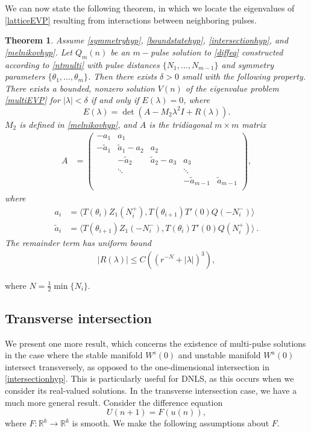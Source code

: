 \documentclass[12pt]{elsarticle}
\def\R{{\mathbb R}}
\newtheorem{theorem}{Theorem}
\begin{document}
We can now state the following theorem, in which we locate the eigenvalues of \cref{latticeEVP} resulting from interactions between neighboring pulses.

\begin{theorem}\label{stabilitytheorem}
Assume \cref{symmetryhyp}, \cref{boundstatehyp}, \cref{intersectionhyp}, and \cref{melnikovhyp}. Let $Q_m(n)$ be an $m-$pulse solution to \cref{diffeq} constructed according to \cref{ntmulti} with pulse distances $\{ N_1, \dots, N_{m-1}\}$ and symmetry parameters $\{\theta_1, \dots, \theta_m\}$. Then there exists $\delta > 0$ small with the following property. There exists a bounded, nonzero solution $V(n)$ of the eigenvalue problem \cref{multiEVP} for $|\lambda| < \delta$ if and only if $E(\lambda) = 0$, where
\begin{equation}\label{Elambda}
E(\lambda) = \det(A - M_2 \lambda^2 I + R(\lambda)).
\end{equation}
$M_2$ is defined in \cref{melnikovhyp}, and $A$ is the tridiagonal $m \times m$ matrix
\begin{align}\label{matrixA}
A &= \begin{pmatrix}
-a_1 & a_1 & & & \\
-\tilde{a}_1 & \tilde{a}_1 - a_2 & a_2 \\
& -\tilde{a}_2 & \tilde{a}_2 - a_3 & a_3 \\
& \ddots & & \ddots \\
& & & -\tilde{a}_{m-1} & \tilde{a}_{m-1}  \\
\end{pmatrix},
\end{align}
where
\begin{align*}
a_i &= \langle T(\theta_i) Z_1(N_i^+), T(\theta_{i+1}) T'(0)Q(-N_i^-) \rangle \\
\tilde{a}_i &= \langle T(\theta_{i+1}) Z_1(-N_i^-), T(\theta_i) T'(0)Q(N_i^+) \rangle \:.
\end{align*}
The remainder term has uniform bound
\begin{align}\label{Rbound2}
|R(\lambda)| \leq C\left( (r^{-N} + |\lambda|)^3 \right),
\end{align}
\end{theorem}
where $N = \frac{1}{2}\min\{N_i\}$.

\subsection{Transverse intersection}

We present one more result, which concerns the existence of multi-pulse solutions in the case where the stable manifold $W^s(0)$ and unstable manifold $W^u(0)$ intersect transversely, as opposed to the one-dimensional intersection in \cref{intersectionhyp}. This is particularly useful for DNLS, as this occurs when we consider its real-valued solutions. In the transverse intersection case, we have a much more general result. Consider the difference equation
\begin{equation}\label{diffeqtransv}
U(n+1) = F(u(n)),
\end{equation}
where $F: \R^k \rightarrow \R^k$ is smooth. We make the following assumptions about $F$.
\end{document}
